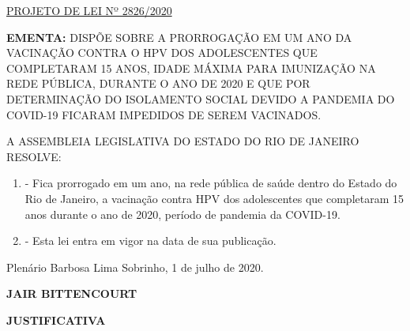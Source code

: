 \documentclass[10pt]{article}
\date{}
\begin{document}
\maketitle
\begin{center}
  \huge
  \vspace{-3cm}\href{http://alerjln1.alerj.rj.gov.br/scpro1923.nsf/f4b46b3cdbba990083256cc900746cf6/d1a35b0c79c23628032585980056d9bc?OpenDocument}{PROJETO DE LEI Nº 2826/2020}
\bigskip
\bigskip
\bigskip
  
\end{center}

\textbf{EMENTA:} 
DISPÕE SOBRE A PRORROGAÇÃO EM UM ANO DA VACINAÇÃO CONTRA O HPV DOS ADOLESCENTES QUE COMPLETARAM 15 ANOS, IDADE MÁXIMA PARA IMUNIZAÇÃO NA REDE PÚBLICA, DURANTE O ANO DE 2020 E QUE POR DETERMINAÇÃO DO ISOLAMENTO SOCIAL DEVIDO A PANDEMIA DO COVID-19 FICARAM IMPEDIDOS DE SEREM VACINADOS.








\bigskip

\noindent
A ASSEMBLEIA LEGISLATIVA DO ESTADO DO RIO DE JANEIRO RESOLVE:

\begin{enumerate}[label=Art. \arabic*\textdegree]
\item - Fica prorrogado em um ano, na rede pública de saúde dentro do Estado do Rio de Janeiro, a vacinação contra HPV dos adolescentes que completaram 15 anos durante o ano de 2020, período de pandemia da COVID-19.

\item - Esta lei entra em vigor na data de sua publicação.


\end{enumerate}




\begin{center}
  Plenário Barbosa Lima Sobrinho, 1 de julho de 2020.

   \bigskip

  \textbf{ JAIR BITTENCOURT}

  \bigskip

  \textbf{JUSTIFICATIVA}
  \bigskip

\end{center}
\end{document}

